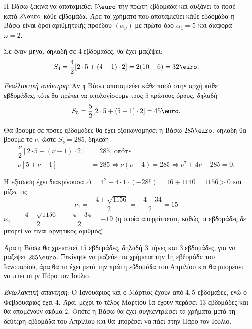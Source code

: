 
\begin{alist}
\item Η Βάσω ξεκινά να αποταμιεύει $5\text{\euro}$ την πρώτη εβδομάδα και αυξάνει το ποσό κατά $2\text{\euro}$ κάθε εβδομάδα. Άρα τα χρήματα που αποταμιεύει κάθε εβδομάδα η Βάσω είναι όροι αριθμητικής προόδου $(\alpha_\nu)$ με πρώτο όρο $\alpha_1 = 5$ και διαφορά $\omega = 2$.

\item
\begin{rlist}
\item Σε έναν μήνα, δηλαδή σε $4$ εβδομάδες, θα έχει μαζέψει:
\[S_4 = \dfrac{4}{2}[2 \cdot 5 + (4 - 1) \cdot 2] = 2(10 + 6) = 32\text{\euro}.\]

\textit{Εναλλακτική απάντηση:} Αν η Βάσω αποταμιεύει κάθε ποσό στην αρχή κάθε εβδομάδας, τότε θα πρέπει να υπολογίσουμε τους $5$ πρώτους όρους, δηλαδή 
\[S_5 = \dfrac{5}{2}[2 \cdot 5 + (5 - 1) \cdot 2] = 45\text{\euro}.\]

\item Θα βρούμε σε πόσες εβδομάδες θα έχει εξοικονομήσει η Βάσω $285\text{\euro}$, δηλαδή θα βρούμε το $\nu$, ώστε $S_\nu = 285$, δηλαδή
\begin{align*}
\dfrac{\nu}{2}[2 \cdot 5 + (\nu - 1) \cdot 2] &= 285\text{, οπότε} \\
\nu[5 + \nu - 1] &= 285 \Leftrightarrow \nu(\nu + 4) = 285 \Leftrightarrow \nu^2 + 4\nu - 285 = 0.
\end{align*}

Η εξίσωση έχει διακρίνουσα $\Delta = 4^2 - 4 \cdot 1 \cdot (-285) = 16 + 1140 = 1156 > 0$ και ρίζες τις
\[\nu_1 = \dfrac{-4 + \sqrt{1156}}{2} = \dfrac{-4 + 34}{2} = 15\]
$\nu_2 = \dfrac{-4 - \sqrt{1156}}{2} = \dfrac{-4 - 34}{2} = -19$ (η οποία απορρίπτεται, καθώς οι εβδομάδες δε μπορεί να είναι αρνητικός αριθμός).

Άρα η Βάσω θα χρειαστεί $15$ εβδομάδες, δηλαδή $3$ μήνες και $3$ εβδομάδες, για να μαζέψει $285\text{\euro}$. Ξεκίνησε να μαζεύει τα χρήματα την 1η εβδομάδα του Ιανουαρίου, άρα θα τα έχει μετά την πρώτη εβδομάδα του Απριλίου και θα μπορέσει να πάει στην Πάρο τον Ιούλιο.

\textit{Εναλλακτική απάντηση:} Ο Ιανουάριος και ο Μάρτιος έχουν από $4,5$ εβδομάδες, ενώ ο Φεβρουάριος έχει $4$. Άρα, μέχρι το τέλος Μαρτίου θα έχουν περάσει $13$ εβδομάδες και θα απομένουν ακόμα $2$. Οπότε η Βάσω θα έχει συγκεντρώσει τα χρήματα μετά τη δεύτερη εβδομάδα του Απριλίου και θα μπορέσει να πάει στην Πάρο τον Ιούλιο.
\end{rlist}


\end{alist}
